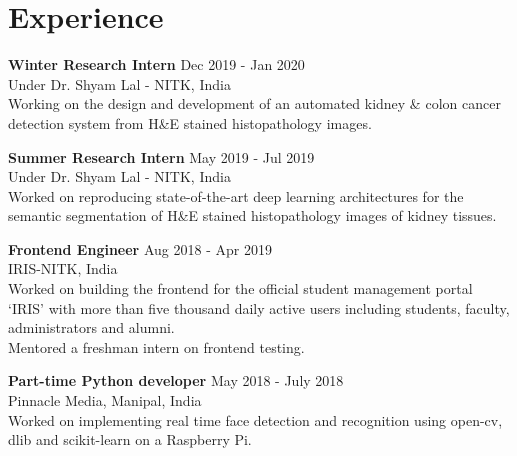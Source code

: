 \documentclass[letterpaper]{article}
\renewenvironment{itemize}{
  \begin{list}{}{
    \setlength{\leftmargin}{1.5em}
  }
}{
  \end{list}
}
\newcommand{\smallGreyFont}[1]{\textcolor{black!80}{\small{#1}}}
\begin{document}
\section*{Experience}
  \begin{itemize}
    \item \textbf{Winter Research Intern}
    \hfill{\textcolor{black!80}{\small{Dec 2019 - Jan 2020}}}\\
    \smallGreyFont{Under Dr. Shyam Lal - NITK, India}\\
      Working on the design and development of an automated kidney \& colon cancer detection system from H\&E stained histopathology images.

    \item \textbf{Summer Research Intern}
    \hfill{\textcolor{black!80}{\small{May 2019 - Jul 2019}}}\\
    \smallGreyFont{Under Dr. Shyam Lal - NITK, India}\\
      Worked on reproducing state-of-the-art deep learning architectures for the semantic segmentation of H\&E stained histopathology images of kidney tissues.

    \item \textbf{Frontend Engineer}
    \hfill{\textcolor{black!80}{\small{Aug 2018 - Apr 2019}}}\\
    \smallGreyFont{IRIS-NITK, India}\\
      Worked on building the frontend for the official student management portal `IRIS' with more than five thousand daily active users including students, faculty, administrators and alumni.\\
      Mentored a freshman intern on frontend testing.

    \item \textbf{Part-time Python developer}
    \hfill{\textcolor{black!80}{\small{May 2018 - July 2018}}}\\
    \smallGreyFont{Pinnacle Media, Manipal, India}\\
      Worked on implementing real time face detection and recognition using open-cv, dlib and scikit-learn on a Raspberry Pi.
  \end{itemize}


\end{document}

